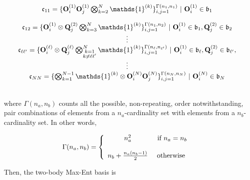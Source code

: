 \documentclass{homework}
\begin{document}
\begin{tcolorbox}[title = N\"aive two-body Max-Ent]
\begin{equation*}
\begin{array}{c}
             \mathfrak{c}_{11} = \{\mathbf{O}_i^{(1)} \mathbf{O}_j^{(1)} \bigotimes_{k=2}^{N} \mathds{1}^{(k)}\}_{\substack{i, j= 1}}^{\Gamma(n_1, n_1)} \blanky | \blanky {\bf O}_i^{(1)} \in \mathfrak{b}_{1}  \\
             \\
             \mathfrak{c}_{12} = \{\mathbf{O}_i^{(1)} \otimes \mathbf{Q}_j^{(2)} \bigotimes_{k=3}^{N} \mathds{1}^{(k)}\}_{\substack{i, j= 1}}^{\Gamma(n_1, n_2)} \blanky | \blanky {\bf O}_i^{(1)} \in \mathfrak{b}_{1}, {\bf Q}_j^{(2)} \in \mathfrak{b}_{2}\\
             \vdots \\
             \mathfrak{c}_{\ell \ell'} =  \{\mathbf{O}_i^{(\ell)} \otimes \mathbf{Q}_j^{(\ell)} \bigotimes_{\substack{k=1 \\
                                   k \neq \ell             \ell'}}^{N} 
            \mathds{1}^{(k)}\}_{\substack{i, j= 1}}^{\Gamma(n_\ell, n_{\ell'})} \blanky | \blanky {\bf O}_i^{(1)} \in \mathfrak{b}_{\ell}, {\bf Q}_j^{(2)} \in \mathfrak{b}_{\ell'},\\
            \vdots \\
            \mathfrak{c}_{NN} = \{\bigotimes_{k=1}^{N-1} \mathds{1}^{(k)} \otimes \mathbf{O}_i^{(N)} \mathbf{O}_j^{(N)}\}_{\substack{i, j= 1}}^{\Gamma(n_N, n_N)} \blanky | \blanky {\bf O}_i^{(N)} \in \mathfrak{b}_{N}  \\
        \end{array}
\end{equation*}

\blanky\\

where $\Gamma(n_a, n_b)$ counts all the possible, non-repeating, order notwithstanding, pair combinations of elements from a $n_a$-cardinality set with elements from a $n_b$-cardinality set. In other words, 

\begin{equation}
    \Gamma(n_a, n_b) = \left\{ \begin{array}{cc}
        n_a^2 & \textnormal{ if } n_a = n_b  \\
        \\
        n_b + \frac{n_a(n_b-1)}{2} & \textnormal{ otherwise }
    \end{array}
    \right. 
\end{equation} 

Then, the two-body Max-Ent basis is 


\end{tcolorbox}
\end{document}
